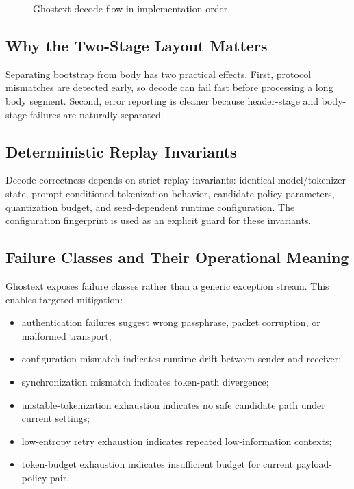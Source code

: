 \begin{figure}[t]
\small
{}
\caption{Ghostext decode flow in implementation order.}
\label{fig:decode-walkthrough}
\end{figure}

\subsection{Why the Two-Stage Layout Matters}

Separating bootstrap from body has two practical effects. First, protocol mismatches are detected early, so decode can fail fast before processing a long body segment. Second, error reporting is cleaner because header-stage and body-stage failures are naturally separated.

\subsection{Deterministic Replay Invariants}

Decode correctness depends on strict replay invariants: identical model/tokenizer state, prompt-conditioned tokenization behavior, candidate-policy parameters, quantization budget, and seed-dependent runtime configuration. The configuration fingerprint is used as an explicit guard for these invariants.

\subsection{Failure Classes and Their Operational Meaning}

Ghostext exposes failure classes rather than a generic exception stream. This enables targeted mitigation:

\begin{itemize}
\item authentication failures suggest wrong passphrase, packet corruption, or malformed transport;
\item configuration mismatch indicates runtime drift between sender and receiver;
\item synchronization mismatch indicates token-path divergence;
\item unstable-tokenization exhaustion indicates no safe candidate path under current settings;
\item low-entropy retry exhaustion indicates repeated low-information contexts;
\item token-budget exhaustion indicates insufficient budget for current payload-policy pair.
\end{itemize}

